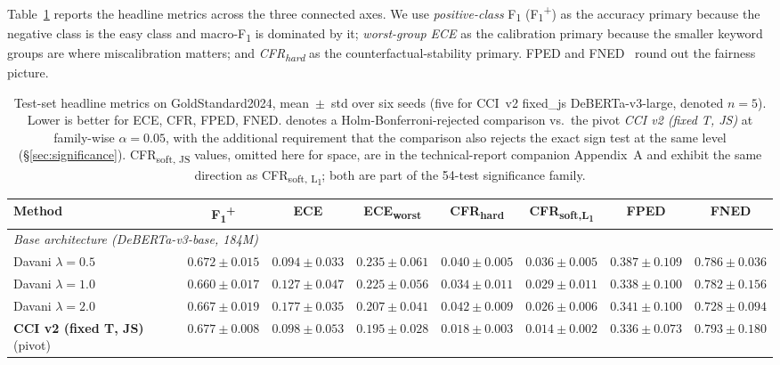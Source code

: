 \documentclass[10pt,a4paper]{article}
\newcommand{\dataset}{GoldStandard2024}
\begin{document}
Table~\ref{tab:main_results} reports the headline metrics across the three connected axes. We use \emph{positive-class} F\textsubscript{1} (F\textsubscript{1}\textsuperscript{+}) as the accuracy primary because the negative class is the easy class and macro-F\textsubscript{1} is dominated by it; \emph{worst-group ECE} as the calibration primary because the smaller keyword groups are where miscalibration matters; and \emph{CFR\textsubscript{hard}} as the counterfactual-stability primary. FPED and FNED~\citep{dixon2018measuring} round out the fairness picture.

\begin{table}[t]
\centering
\caption{Test-set headline metrics on \dataset{}, mean~$\pm$~std over six seeds (five for CCI~v2 fixed\_js DeBERTa-v3-large, denoted $n=5$). Lower is better for ECE, CFR, FPED, FNED. \textbf{\*} denotes a Holm-Bonferroni-rejected comparison vs.\ the pivot \emph{CCI v2 (fixed T, JS)} at family-wise $\alpha = 0.05$, with the additional requirement that the comparison also rejects the exact sign test at the same level (\S\ref{sec:significance}). CFR\textsubscript{soft, JS} values, omitted here for space, are in the technical-report companion Appendix~A and exhibit the same direction as CFR\textsubscript{soft, L\textsubscript{1}}; both are part of the 54-test significance family.}
\label{tab:main_results}
\scriptsize
\setlength{\tabcolsep}{3pt}
\begin{tabular}{@{}lccccccc@{}}
\toprule
\textbf{Method} & \textbf{F\textsubscript{1}\textsuperscript{+}} & \textbf{ECE} & \textbf{ECE\textsubscript{worst}} & \textbf{CFR\textsubscript{hard}} & \textbf{CFR\textsubscript{soft,L\textsubscript{1}}} & \textbf{FPED} & \textbf{FNED} \\
\midrule
\multicolumn{8}{l}{\emph{Base architecture (DeBERTa-v3-base, 184M)}} \\
Davani $\lambda=0.5$            & $0.672 \pm 0.015$ & $0.094 \pm 0.033$ & $0.235 \pm 0.061$ & $0.040 \pm 0.005$\textbf{\*} & $0.036 \pm 0.005$\textbf{\*} & $0.387 \pm 0.109$ & $0.786 \pm 0.036$ \\
Davani $\lambda=1.0$            & $0.660 \pm 0.017$ & $0.127 \pm 0.047$ & $0.225 \pm 0.056$ & $0.034 \pm 0.011$ & $0.029 \pm 0.011$ & $0.338 \pm 0.100$ & $0.782 \pm 0.156$ \\
Davani $\lambda=2.0$            & $0.667 \pm 0.019$ & $0.177 \pm 0.035$ & $0.207 \pm 0.041$ & $0.042 \pm 0.009$ & $0.026 \pm 0.006$ & $0.341 \pm 0.100$ & $\mathbf{0.728 \pm 0.094}$ \\
\textbf{CCI v2 (fixed T, JS)} (pivot) & $\mathbf{0.677 \pm 0.008}$ & $0.098 \pm 0.053$ & $0.195 \pm 0.028$ & $0.018 \pm 0.003$ & $0.014 \pm 0.002$ & $0.336 \pm 0.073$ & $0.793 \pm 0.180$ \\

\end{tabular}
\end{table}
\end{document}
